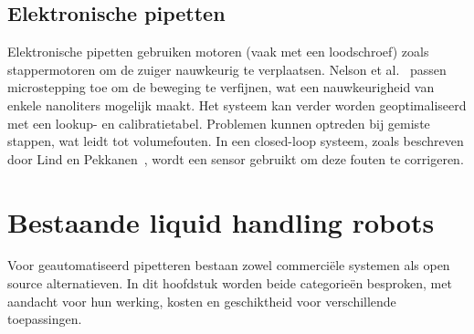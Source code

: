 \subsection{Elektronische pipetten}
Elektronische pipetten gebruiken motoren (vaak met een loodschroef) zoals stappermotoren om de zuiger nauwkeurig te verplaatsen. Nelson et al.\ \cite{RN35} passen microstepping toe om de beweging te verfijnen, wat een nauwkeurigheid van enkele nanoliters mogelijk maakt. Het systeem kan verder worden geoptimaliseerd met een lookup- en calibratietabel. Problemen kunnen optreden bij gemiste stappen, wat leidt tot volumefouten. In een closed-loop systeem, zoals beschreven door Lind en Pekkanen\ \cite{RN36}, wordt een sensor gebruikt om deze fouten te corrigeren.

\section{Bestaande liquid handling robots}
Voor geautomatiseerd pipetteren bestaan zowel commerciële systemen als open source alternatieven. In dit hoofdstuk worden beide categorieën besproken, met aandacht voor hun werking, kosten en geschiktheid voor verschillende toepassingen.
